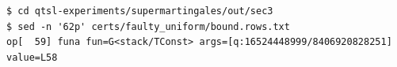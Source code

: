 \begin{Verbatim}[fontsize=\small,frame=leftline,rulecolor=\color{accentmid},framesep=3mm,xleftmargin=3mm]
$ cd qtsl-experiments/supermartingales/out/sec3
$ sed -n '62p' certs/faulty_uniform/bound.rows.txt
op[  59] funa fun=G<stack/TConst> args=[q:16524448999/8406920828251] value=L58
\end{Verbatim}

